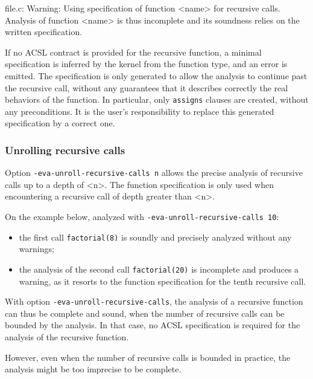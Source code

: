 \documentclass{frama-c-book}
\begin{document}
\begin{logsmath}
[eva] file.c: Warning:
  Using specification of function <name> for recursive calls.
  Analysis of function <name> is thus incomplete and its soundness
  relies on the written specification.
\end{logsmath}

If no ACSL contract is provided for the recursive function,
a minimal specification is inferred by the \FramaC kernel
from the function type, and an error is emitted.
The specification is only generated to allow the analysis to continue
past the recursive call, without any guarantees that it describes correctly
the real behaviors of the function.
In particular, only \lstinline|assigns| clauses are created, without any
preconditions.
It is the user's responsibility to replace this generated specification by
a correct one.

\subsubsection{Unrolling recursive calls}

Option \lstinline|-eva-unroll-recursive-calls n| allows the precise analysis
of recursive calls up to a depth of <n>. The function specification is only used
when encountering a recursive call of depth greater than <n>.

On the example below, analyzed with \lstinline|-eva-unroll-recursive-calls 10|:
\begin{itemize}
\item
  the first call \lstinline|factorial(8)| is soundly and precisely analyzed
  without any warnings;
\item
  the analysis of the second call \lstinline|factorial(20)| is incomplete and
  produces a warning, as it resorts to the function specification for the tenth
  recursive call.
\end{itemize}


With option \lstinline|-eva-unroll-recursive-calls|,
the analysis of a recursive function can thus be complete and sound,
when the number of recursive calls can be bounded by the analysis.
In that case, no ACSL specification is required for the analysis of the
recursive function.

However, even when the number of recursive calls is bounded in practice,
the \Eva{} analysis might be too imprecise to be complete.
\end{document}
